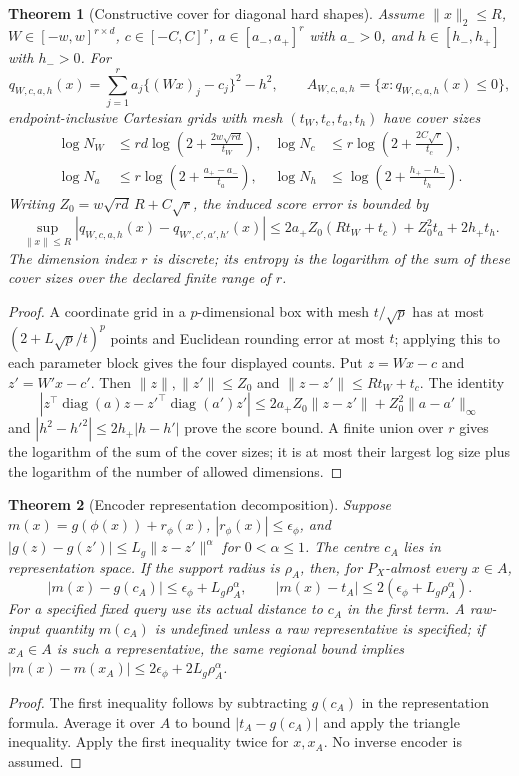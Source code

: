 \documentclass[11pt,a4paper]{article}
\numberwithin{equation}{section}
\newtheorem{theorem}{Theorem}[section]
\theoremstyle{definition}\newtheorem{definition}[theorem]{Definition}
\theoremstyle{remark}\newtheorem{remark}[theorem]{Remark}
\begin{document}
\begin{theorem}[Constructive cover for diagonal hard shapes]\label{thm:diagcover}
Assume $\|x\|_2\le R$, $W\in[-w,w]^{r\times d}$, $c\in[-C,C]^r$,
$a\in[a_-,a_+]^r$ with $a_->0$, and $h\in[h_-,h_+]$ with $h_->0$. For
\[
 q_{W,c,a,h}(x)=\sum_{j=1}^r a_j\{(Wx)_j-c_j\}^2-h^2,
 \qquad A_{W,c,a,h}=\{x:q_{W,c,a,h}(x)\le0\},
\]
endpoint-inclusive Cartesian grids with mesh $(t_W,t_c,t_a,t_h)$ have cover sizes
\[
 \begin{aligned}
 \log N_W&\le rd\log\!\left(2+\frac{2w\sqrt{rd}}{t_W}\right),&
 \log N_c&\le r\log\!\left(2+\frac{2C\sqrt r}{t_c}\right),\\
 \log N_a&\le r\log\!\left(2+\frac{a_+-a_-}{t_a}\right),&
 \log N_h&\le \log\!\left(2+\frac{h_+-h_-}{t_h}\right).
 \end{aligned}
\]
Writing $Z_0=w\sqrt{rd}\,R+C\sqrt r$, the induced score error is bounded by
\[
 \sup_{\|x\|\le R}|q_{W,c,a,h}(x)-q_{W',c',a',h'}(x)|
 \le2a_+Z_0(Rt_W+t_c)+Z_0^2t_a+2h_+t_h.
\]
The dimension index $r$ is discrete; its entropy is the logarithm of the sum of these cover sizes over the declared finite range of $r$.
\end{theorem}
\begin{proof}
A coordinate grid in a $p$-dimensional box with mesh $t/\sqrt p$ has at most
$(2+L\sqrt p/t)^p$ points and Euclidean rounding error at most $t$; applying this to each parameter block gives the four displayed counts. Put $z=Wx-c$ and $z'=W'x-c'$. Then $\|z\|,\|z'\|\le Z_0$ and $\|z-z'\|\le Rt_W+t_c$. The identity
\[
 |z^\top\!\operatorname{diag}(a)z-z'^\top\!\operatorname{diag}(a')z'|
 \le2a_+Z_0\|z-z'\|+Z_0^2\|a-a'\|_\infty
\]
and $|h^2-h'^2|\le2h_+|h-h'|$ prove the score bound. A finite union over $r$ gives the logarithm of the sum of the cover sizes; it is at most their largest log size plus the logarithm of the number of allowed dimensions.
\end{proof}

\begin{theorem}[Encoder representation decomposition]\label{thm:encdecomp}
Suppose $m(x)=g(\phi(x))+r_\phi(x)$, $|r_\phi(x)|\le\epsilon_\phi$, and
$|g(z)-g(z')|\le L_g\|z-z'\|^\alpha$ for $0<\alpha\le1$.
The centre $c_A$ lies in representation space. If the support radius is
$\rho_A$, then, for $P_X$-almost every $x\in A$,
\[
 |m(x)-g(c_A)|\le\epsilon_\phi+L_g\rho_A^\alpha,
 \qquad |m(x)-t_A|\le2(\epsilon_\phi+L_g\rho_A^\alpha).
\]
For a specified fixed query use its actual distance to $c_A$ in the first term.
A raw-input quantity $m(c_A)$ is undefined unless a raw representative is
specified; if $x_A\in A$ is such a representative, the same regional bound
implies $|m(x)-m(x_A)|\le2\epsilon_\phi+2L_g\rho_A^\alpha$.
\end{theorem}
\begin{proof}
The first inequality follows by subtracting $g(c_A)$ in the representation
formula. Average it over $A$ to bound $|t_A-g(c_A)|$ and apply the triangle
inequality. Apply the first inequality twice for $x,x_A$. No inverse encoder
is assumed.\end{proof}
\end{document}
